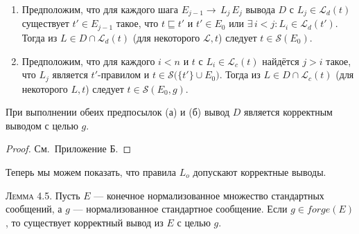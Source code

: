 \begin{enumerate}
\item
  Предположим, что для каждого шага
  \(E_{j-1} \rightarrow{\,L_j\,} E_j\) вывода \(D\)
  с \(L_j \in \mathcal L_{d}(t)\)
  существует \(t'\in E_{j-1}\) такое, что
  \(t \sqsubseteq t'\) и
  \(t'\in E_0\) \;или\;
  \(\exists\,i<j: L_i\in \mathcal L_{d}(t')\).
  Тогда из \(L\in D\cap \mathcal L_{d}(t)\)
  (для некоторого \(\mathcal L,t\)) следует
  \(t\in \mathcal S(E_0)\).

\item
  Предположим, что для каждого \(i<n\) и \(t\) с
  \(L_i\in \mathcal L_{c}(t)\)
  найдётся \(j>i\) такое, что
  \(L_j\) является \(t'\)-правилом
  и \(t\in \mathcal S\bigl(\{t'\}\cup E_0\bigr)\).
  Тогда из \(L\in D\cap \mathcal L_{c}(t)\)
  (для некоторого \(L,t\)) следует
  \(t\in \mathcal S(E_0,g)\).
\end{enumerate}

При выполнении обеих предпосылок (а) и (б)
вывод \(D\) является корректным 
выводом с целью \(g\).

\begin{proof} См.\ Приложение Б.\end{proof}

Теперь мы можем показать, что правила \(L_{o}\) допускают
корректные выводы.

\textsc{Лемма 4.5.}
Пусть \(E\) — конечное нормализованное множество стандартных сообщений,
а \(g\) — нормализованное стандартное сообщение.
Если \(g\in forge(E)\),
то существует корректный вывод из \(E\) с целью \(g\).

